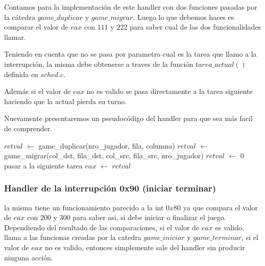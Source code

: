 \documentclass[a4paper,10pt,twoside]{article}
\newenvironment{pseudocodigo}
    {\vspace{0.5em} \begin{algorithmic}}
    {\end{algorithmic} \vspace{0.5em}}
\begin{document}
Contamos para la implementación de este handler con dos funciones pasadas por la cátedra $game\_duplicar$ y $game\_migrar$. Luego lo que debemos haces es comparar el valor de $eax$ con $111$ y $222$ para saber cual de las dos funcionalidades llamar.

Teniendo en cuenta que no se pasa por parametro cual es la tarea que llamo a la interrupción, la misma debe obtenerse a traves de la función $tarea\_actual()$ definida en $sched.c$.

Además si el valor de $eax$ no es valido se pasa directamente a la tarea siguiente haciendo que la actual pierda su turno.

Nuevamente presentaremos un pseudocódigo del handler para que sea más facil de comprender.

\begin{pseudocodigo}
    \STATE $retval$ $\leftarrow$ game\_duplicar(nro\_jugador, fila, columna)
  \ELSE
      \STATE $retval$ $\leftarrow$ game\_migrar(col\_dst, fila\_dst, col\_src, fila\_src, nro\_jugador)
    \ELSE
      \STATE $retval$ $\leftarrow$ $0$
    \ENDIF
  \ENDIF
  \STATE pasar a la siguiente tarea
  \STATE $eax$ $\leftarrow$ $retval$
\end{pseudocodigo}



\subsubsection{Handler de la interrupción 0x90 (iniciar terminar) }
la misma tiene un funcionamiento parecido a la int $0x80$ ya que compara el valor de $eax$ con $200$ y $300$ para saber asi, si debe iniciar o finalizar el juego. Dependiendo del resultado de las comparaciones, si el valor de $eax$ es valido, llama a las funcionas creadas por la catedra $game\_iniciar$ y $game\_terminar$, si el valor de $eax$ no es valido, entonces simplemente sale del handler sin producir ninguna acción.
\end{document}
